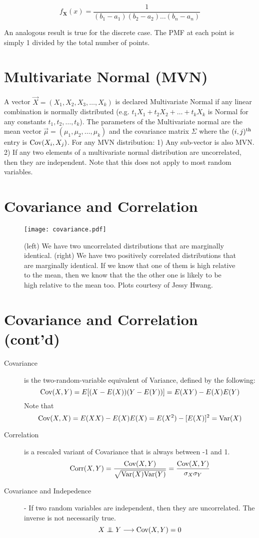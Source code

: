 \documentclass[11.5pt]{article}
\begin{document}
\begin{notes}
$$ f_{\mathbf{X}}(x) = \frac{1}{(b_1 - a_1) (b_2 - a_2) \ldots (b_n - a_n)}$$

An analogous result is true for the discrete case. The PMF at each point is simply 1 divided by the total number of points. 

\section*{Multivariate Normal (MVN)}
A vector $\vec{X} = (X_1, X_2, X_3, \dots, X_k)$ is declared Multivariate Normal if any linear combination is normally distributed (e.g. $t_1X_1 + t_2X_2 + \dots + t_kX_k$ is Normal for any constants $t_1, t_2, \dots, t_k$). The parameters of the Multivariate normal are the mean vector $\vec{\mu} = (\mu_1, \mu_2, \dots, \mu_k)$ and the covariance matrix $\Sigma$ where the $(i, j)^{\textnormal{th}}$ entry is $\textrm{Cov}(X_i, X_j)$. For any MVN distribution: 1) Any sub-vector is also MVN. 2) If any two elements of a multivariate normal distribution are uncorrelated, then they are independent. Note that this does not apply to most random variables. 

\section*{Covariance and Correlation}
\begin{figure}[h]\centering
\texttt{[image: covariance.pdf]}
\caption{(left) We have two uncorrelated distributions that are marginally identical. (right) We have two positively correlated distributions that are marginally identical. If we know that one of them is high relative to the mean, then we know that the the other one is likely to be high relative to the mean too. Plots courtesy of Jessy Hwang.}
\end{figure}

\newpage

\section*{Covariance and Correlation (cont'd)}
\begin{description}
\item [Covariance] is the two-random-variable equivalent of Variance, defined by the following:
	\[\textrm{Cov}(X, Y) = E[(X - E(X))(Y - E(Y))] = E(XY) - E(X)E(Y)\]
	Note that 
	\[\textrm{Cov}(X, X) = E(XX) - E(X)E(X) =  E(X^2) - [E(X)]^2 = \textrm{Var}(X)\]
\item [Correlation] is a rescaled variant of Covariance that is always between -1 and 1.
	\[\textrm{Corr}(X, Y) = \frac{\textrm{Cov}(X, Y)}{\sqrt{\textrm{Var}(X)\textrm{Var}(Y)}} = \frac{\textrm{Cov}(X, Y)}{\sigma_X\sigma_Y}\]
\item [Covariance and Indepedence] - If two random variables are independent, then they are uncorrelated. The inverse is not necessarily true. 
	\[X \independent Y \longrightarrow \cov(X, Y) = 0\]


\end{description}
\end{notes}
\end{document}
